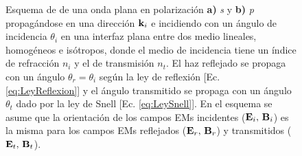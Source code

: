 \begin{figure}[h!]
\begin{subfigure}{.43\textwidth}
	\end{subfigure} 
	\caption{ Esquema de de una onda plana en polarización \textbf{a)} \emph{s} y \textbf{b)} \emph{p} propagándose en una dirección $\vb{k}_i$ e incidiendo con un ángulo de incidencia $\theta_i$ en una interfaz plana entre dos medio lineales, homogéneos e isótropos, donde el medio de incidencia tiene un índice de refracción $n_i$ y el de transmisión $n_t$. El haz reflejado se propaga con un ángulo $\theta_r=\theta_i$ según la ley de reflexión [Ec. \eqref{eq:LeyReflexion}] y el ángulo transmitido se propaga con un ángulo $\theta_t$ dado por la ley de Snell [Ec. \eqref{eq:LeySnell}]. En el esquema se asume que la orientación de los campos EMs incidentes  ($\vb{E}_i,\,\vb{B}_i$) es la misma para los campos EMs reflejados ($\vb{E}_r,\,\vb{B}_r$) y transmitidos ($\vb{E}_t,\,\vb{B}_t$).}	\label{fig:Polarizaciones}	
	\end{figure}	
%

